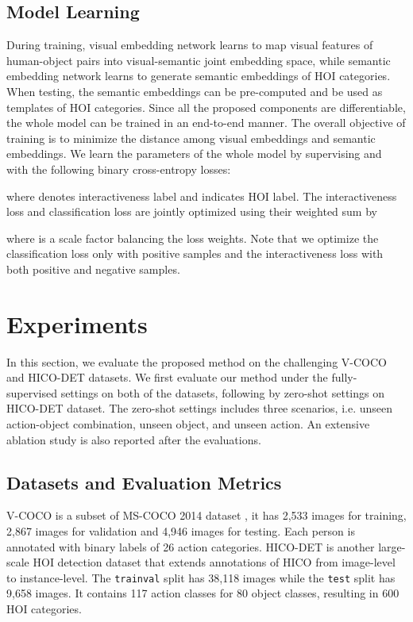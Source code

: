 \documentclass[sigconf,screen]{acmart}
\begin{document}
\subsection{Model Learning}

During training, visual embedding network learns to map visual features of human-object pairs into visual-semantic joint embedding space, while semantic embedding network learns to generate semantic embeddings of HOI categories. When testing, the semantic embeddings can be pre-computed and be used as templates of HOI categories. Since all the proposed components are differentiable, the whole model can be trained in an end-to-end manner. The overall objective of training is to minimize the distance among visual embeddings and semantic embeddings. We learn the parameters of the whole model by supervising  and  with the following binary cross-entropy losses:

where  denotes interactiveness label and  indicates HOI label. The interactiveness loss  and classification loss  are jointly optimized using their weighted sum by

where  is a scale factor balancing the loss weights. Note that we optimize the classification loss only with positive samples and the interactiveness loss with both positive and negative samples. 

\section{Experiments}

In this section, we evaluate the proposed method on the challenging V-COCO \cite{gupta2015visual} and HICO-DET \cite{chao2018learning} datasets. We first evaluate our method under the fully-supervised settings on both of the datasets, following by zero-shot settings on HICO-DET dataset. The zero-shot settings includes three scenarios, i.e. unseen action-object combination, unseen object, and unseen action. An extensive ablation study is also reported after the evaluations.

\subsection{Datasets and Evaluation Metrics}

V-COCO is a subset of MS-COCO 2014 dataset \cite{lin2014microsoft}, it has 2,533 images for training, 2,867 images for validation and 4,946 images for testing. Each person is annotated with binary labels of 26 action categories. HICO-DET is another large-scale HOI detection dataset that extends annotations of HICO \cite{chao2015hico} from image-level to instance-level. The \verb|trainval| split has 38,118 images while the \verb|test| split has 9,658 images. It contains 117 action classes for 80 object classes, resulting in 600 HOI categories.
\end{document}
